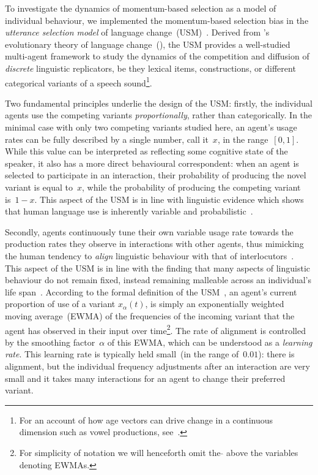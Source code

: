 To investigate the dynamics of momentum-based selection as a model of individual behaviour, we implemented the momentum-based selection bias in the \emph{utterance selection model} of language change~(USM)~\citep{Baxter2006,Blythe2012}. Derived from \citeauthor{Croft2000}'s evolutionary theory of language change~(\citeyear{Croft2000}), the USM provides a well-studied multi-agent framework to study the dynamics of the competition and diffusion of \emph{discrete} linguistic replicators, be they lexical items, constructions, or different categorical variants of a speech sound\footnote{For an account of how age vectors can drive change in a continuous dimension such as vowel productions, see~\citet{Swarup2012}.}.

Two fundamental principles underlie the design of the USM: firstly, the individual agents use the competing variants \emph{proportionally}, rather than categorically. In the minimal case with only two competing variants studied here, an agent's usage rates can be fully described by a single number, call it~$x$, in the range~$[0,1]$.
While this value can be interpreted as reflecting some cognitive state of the speaker, it also has a more direct behavioural correspondent: when an agent is selected to participate in an interaction, their probability of producing the novel variant is equal to~$x$, while the probability of producing the competing variant is~$1-x$. This aspect of the USM is in line with linguistic evidence which shows that human language use is inherently variable and probabilistic~\citep{Kroch1994,Labov1994,Bybee2007,Nardy2013}.

Secondly, agents continuously tune their own variable usage rate towards the production rates they observe in interactions with other agents, thus mimicking the human tendency to \emph{align} linguistic behaviour with that of interlocutors~\citep{Giles1991,Branigan2000,Jaeger2013}. This aspect of the USM is in line with the finding that many aspects of linguistic behaviour do not remain fixed, instead remaining malleable across an individual's life span~\citep{Kerswill1996,Sankoff2007,LCAS2009,Bowie2013,Stanford2014handbook}. According to the formal definition of the USM~\citep{Baxter2006}, an agent's current proportion of use of a variant $x_\alpha(t)$, is simply an exponentially weighted moving average~(EWMA) of the frequencies of the incoming variant that the agent has observed in their input over time\footnote{For simplicity of notation we will henceforth omit the $\hat{}$ above the variables denoting EWMAs.}. The rate of alignment is controlled by the smoothing factor~$\alpha$ of this EWMA, which can be understood as a \emph{learning rate}. This learning rate is typically held small~(in the range of~$0.01$): there is alignment, but the individual frequency adjustments after an interaction are very small and it takes many interactions for an agent to change their preferred variant.

